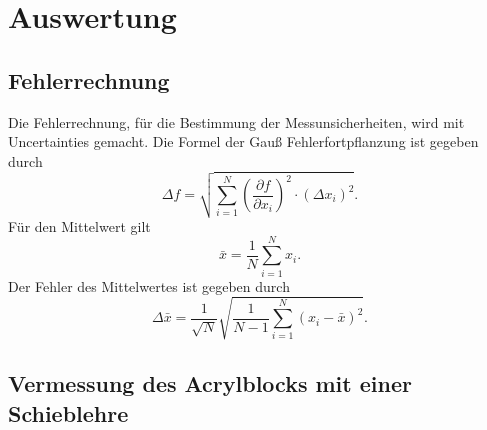 \section{Auswertung}
\label{sec:auswertung}

\subsection{Fehlerrechnung}
\label{sec:Fehlerrechnung}
Die Fehlerrechnung, für die Bestimmung der Messunsicherheiten, wird mit Uncertainties \cite{uncertainties} gemacht.
Die Formel der Gauß Fehlerfortpflanzung ist gegeben durch
\begin{equation}
    \Delta f=\sqrt{\sum_{i=1}^N\left(\frac{\partial f}{\partial x_i}\right)^2 \cdot\left(\Delta x_i\right)^2}.
    \label{eqn:gauss}
\end{equation}
Für den Mittelwert gilt 
\begin{equation}
    \bar{x} = \frac{1}{N}\sum\limits_{i = 1}^N x_i .
    \label{eqn:mittelwert}
\end{equation}
Der Fehler des Mittelwertes ist gegeben durch 
\begin{equation}
    \Delta \bar{x}=\frac{1}{\sqrt{N}} \sqrt{\frac{1}{N-1} \sum_{i=1}^N\left(x_i-\bar{x}\right)^2}.
    \label{eqn:mittelwertfehler}
\end{equation}

\subsection{Vermessung des Acrylblocks mit einer Schieblehre}
\label{Vermessung des Acrylblocks mit einer Schieblehre}

